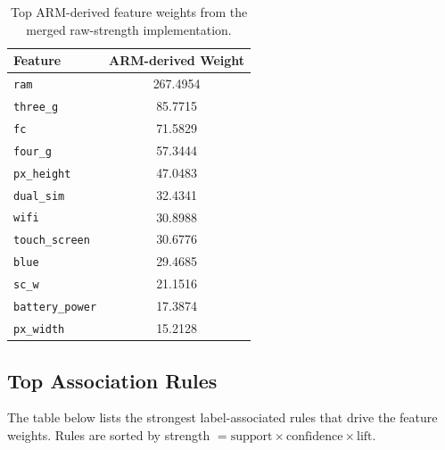 \documentclass[11pt, a4paper]{article}
\begin{document}
\begin{table}[H]
    \centering
    \begin{tabular}{@{}lc@{}}
        \toprule
        \textbf{Feature} & \textbf{ARM-derived Weight} \\ \midrule
        \texttt{ram}             & 267.4954 \\
        \texttt{three\_g}        & 85.7715 \\
        \texttt{fc}              & 71.5829 \\
        \texttt{four\_g}         & 57.3444 \\
        \texttt{px\_height}      & 47.0483 \\
        \texttt{dual\_sim}       & 32.4341 \\
        \texttt{wifi}            & 30.8988 \\
        \texttt{touch\_screen}   & 30.6776 \\
        \texttt{blue}            & 29.4685 \\
        \texttt{sc\_w}           & 21.1516 \\
        \texttt{battery\_power}  & 17.3874 \\
        \texttt{px\_width}       & 15.2128 \\ \bottomrule
    \end{tabular}
    \caption{Top ARM-derived feature weights from the merged raw-strength implementation.}
\end{table}

\subsection*{Top Association Rules}

The table below lists the strongest label-associated rules that drive the feature weights.
Rules are sorted by strength $= \text{support} \times \text{confidence} \times \text{lift}$.
\end{document}
